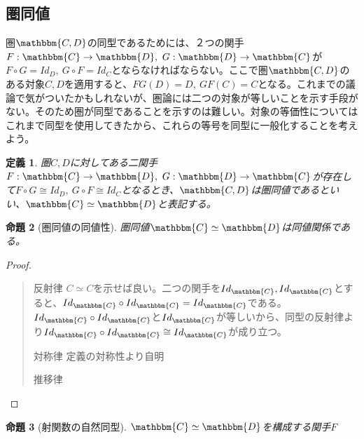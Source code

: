 \documentclass[uplatex,dvipdfmx]{jsarticle}
\newcommand{\cat}[1]{\mathbbm{#1}}
\newcommand{\arrow}{\rightarrow}
\newcommand{\functor}[3]{#1:\cat{#2}\arrow \cat{#3}}
\newtheorem{proof}{証明}[section]
\newtheorem{prop}[proof]{命題}
\newtheorem{define}[proof]{定義}
\numberwithin{proof}{subsection}
\newenvironment{mydescription}
{\begin{description}
  \setlength{\parskip}{0.5cm}
}
{\end{description}}
\begin{document}
  \subsection{圏同値}
  圏$\cat{C,D}$の同型であるためには、２つの関手$\functor{F}{C}{D},\ \functor{G}{D}{C}$が$F\circ G=Id_D,\ G\circ F=Id_C$とならなければならない。ここで圏$\cat{C,D}$のある対象$C,D$を適用すると、$FG(D)=D,\ GF(C)=C$となる。これまでの議論で気がついたかもしれないが、圏論には二つの対象が等しいことを示す手段がない。そのため圏が同型であることを示すのは難しい。対象の等価性についてはこれまで同型を使用してきたから、これらの等号を同型に一般化することを考えよう。\\
  \begin{define}
    圏$C,D$に対してある二関手$\functor{F}{C}{D},\ \functor{G}{D}{C}$が存在して$F\circ G\cong Id_D,\ G\circ F\cong Id_C$となるとき、$\cat{C,D}$は圏同値であるといい、$\cat{C}\simeq \cat{D}$と表記する。
  \end{define}
  \begin{prop}[圏同値の同値性]
    圏同値$\cat{C}\simeq \cat{D}$は同値関係である。
  \end{prop}
  \begin{proof}
    \begin{quote}
			\begin{mydescription}
				\item[反射律] $C\simeq C$を示せば良い。二つの関手を$Id_\cat{C},Id_\cat{C}$とすると、$Id_\cat{C}\circ Id_\cat{C}=Id_\cat{C}$である。$Id_\cat{C}\circ Id_\cat{C}$と$Id_\cat{C}$が等しいから、同型の反射律より$Id_\cat{C}\circ Id_\cat{C}\cong Id_\cat{C}$が成り立つ。
				\item[対称律]定義の対称性より自明
				\item[推移律]
      \end{mydescription}
    \end{quote}
  \end{proof}
  \begin{prop}[射関数の自然同型]
    $\cat{C}\simeq\cat{D}$を構成する関手$F$
  \end{prop}
\end{document}
